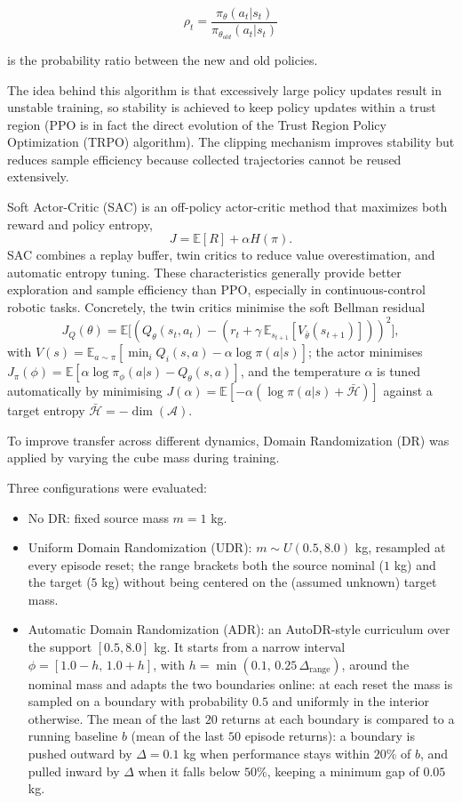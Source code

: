 \[
\rho_t = \frac{\pi_\theta(a_t|s_t)}{\pi_{\theta_{old}}(a_t|s_t)}
\]

is the probability ratio between the new and old policies.


The idea behind this algorithm is that excessively large policy updates result in unstable training, so stability is achieved to keep policy updates within a trust region (PPO is in fact the direct evolution of the Trust Region Policy Optimization (TRPO) \cite{SchulmanTRPO2015} algorithm).
The clipping mechanism improves stability but reduces sample efficiency because collected trajectories cannot be reused extensively.


Soft Actor-Critic (SAC) is an off-policy actor-critic method that maximizes both reward and policy entropy,
\[
J = \mathbb E[R] + \alpha H(\pi).
\]
SAC combines a replay buffer, twin critics to reduce value overestimation, and automatic entropy tuning. These characteristics generally provide better exploration and sample efficiency than PPO, especially in continuous-control robotic tasks.
Concretely, the twin critics minimise the soft Bellman residual
\[
J_Q(\theta)=\mathbb{E}\big[(Q_\theta(s_t,a_t)-(r_t+\gamma\,\mathbb{E}_{s_{t+1}}[V_{\bar\theta}(s_{t+1})]))^2\big],
\]
with $V(s)=\mathbb{E}_{a\sim\pi}[\min_i Q_i(s,a)-\alpha\log\pi(a|s)]$; the actor minimises
$J_\pi(\phi)=\mathbb{E}[\alpha\log\pi_\phi(a|s)-Q_\theta(s,a)]$, and the temperature $\alpha$ is
tuned automatically by minimising $J(\alpha)=\mathbb{E}[-\alpha(\log\pi(a|s)+\bar{\mathcal{H}})]$
against a target entropy $\bar{\mathcal{H}}=-\dim(\mathcal{A})$.

To improve transfer across different dynamics, Domain Randomization (DR) was applied by varying the cube mass during training.

Three configurations were evaluated:
\begin{itemize}
    \item No DR: fixed source mass $m=1$ kg.
    \item Uniform Domain Randomization (UDR): $m \sim U(0.5,8.0)$ kg, resampled at every episode reset; the range brackets both the source nominal ($1$ kg) and the target ($5$ kg) without being centered on the (assumed unknown) target mass.
    \item Automatic Domain Randomization (ADR): an AutoDR-style curriculum over the support $[0.5,8.0]$ kg. It starts from a narrow interval $\phi=[1.0-h,\,1.0+h]$, with $h=\min(0.1,\,0.25\,\Delta_{\text{range}})$,
    around the nominal mass and adapts the two boundaries online: at each reset the mass is sampled on a boundary with probability $0.5$ and uniformly in the interior otherwise.
    The mean of the last $20$ returns at each boundary is compared to a running baseline $b$ (mean of the last $50$ episode returns): a boundary is pushed outward by $\Delta=0.1$ kg when performance stays within $20\%$ of $b$, and pulled inward by $\Delta$ when it falls below $50\%$, keeping a minimum gap of $0.05$ kg.
\end{itemize}

